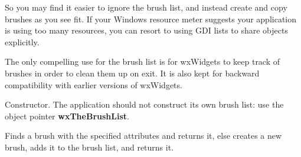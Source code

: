 So you may find it easier to ignore the brush list, and instead create
and copy brushes as you see fit. If your Windows resource meter suggests
your application is using too many resources, you can resort to using
GDI lists to share objects explicitly.

The only compelling use for the brush list is for wxWidgets to keep
track of brushes in order to clean them up on exit. It is also kept for
backward compatibility with earlier versions of wxWidgets.





\label{wxbrushlistconstr}


Constructor. The application should not construct its own brush list:
use the object pointer {\bf wxTheBrushList}.


\label{wxbrushlistfindorcreatebrush}


Finds a brush with the specified attributes and returns it, else creates a new brush, adds it
to the brush list, and returns it.





